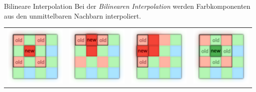 \begin{defi}[Demosaicing]{Bilineare Interpolation}
    Bei der \emph{Bilinearen Interpolation} werden Farbkomponenten aus den unmittelbaren Nachbarn interpoliert.

    \centering
    \begin{tabular}{cccc}
        \includegraphics[width=0.15\linewidth]{figures/demosaicing-interpolation-diagonal.png}   &
        \includegraphics[width=0.15\linewidth]{figures/demosaicing-interpolation-horizontal.png} &
        \includegraphics[width=0.15\linewidth]{figures/demosaicing-interpolation-vertical.png}   &
        \includegraphics[width=0.15\linewidth]{figures/demosaicing-interpolation-green.png}
    \end{tabular}
\end{defi}

